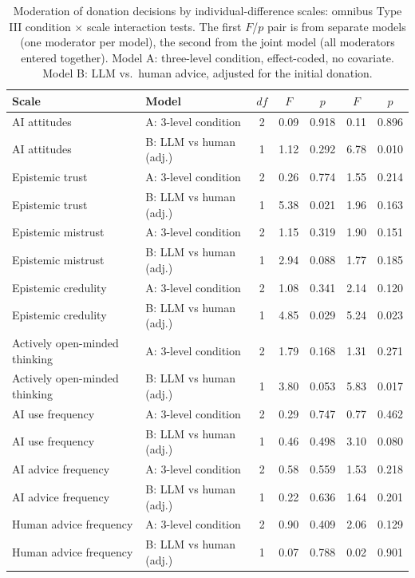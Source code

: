 \begin{table}

\caption{\label{tab:scale_moderation}Moderation of donation decisions by individual-difference scales: omnibus Type III condition $\times$ scale interaction tests. The first $F$/$p$ pair is from separate models (one moderator per model), the second from the joint model (all moderators entered together). Model A: three-level condition, effect-coded, no covariate. Model B: LLM vs.\ human advice, adjusted for the initial donation.}
\centering
\begin{tabular}[t]{llccccc}
\toprule
Scale & Model & $df$ & $F$ & $p$ & $F$ & $p$\\
\midrule
AI attitudes & A: 3-level condition & 2 & 0.09 & 0.918 & 0.11 & 0.896\\
AI attitudes & B: LLM vs human (adj.) & 1 & 1.12 & 0.292 & 6.78 & 0.010\\
Epistemic trust & A: 3-level condition & 2 & 0.26 & 0.774 & 1.55 & 0.214\\
Epistemic trust & B: LLM vs human (adj.) & 1 & 5.38 & 0.021 & 1.96 & 0.163\\
Epistemic mistrust & A: 3-level condition & 2 & 1.15 & 0.319 & 1.90 & 0.151\\
\addlinespace
Epistemic mistrust & B: LLM vs human (adj.) & 1 & 2.94 & 0.088 & 1.77 & 0.185\\
Epistemic credulity & A: 3-level condition & 2 & 1.08 & 0.341 & 2.14 & 0.120\\
Epistemic credulity & B: LLM vs human (adj.) & 1 & 4.85 & 0.029 & 5.24 & 0.023\\
Actively open-minded thinking & A: 3-level condition & 2 & 1.79 & 0.168 & 1.31 & 0.271\\
Actively open-minded thinking & B: LLM vs human (adj.) & 1 & 3.80 & 0.053 & 5.83 & 0.017\\
\addlinespace
AI use frequency & A: 3-level condition & 2 & 0.29 & 0.747 & 0.77 & 0.462\\
AI use frequency & B: LLM vs human (adj.) & 1 & 0.46 & 0.498 & 3.10 & 0.080\\
AI advice frequency & A: 3-level condition & 2 & 0.58 & 0.559 & 1.53 & 0.218\\
AI advice frequency & B: LLM vs human (adj.) & 1 & 0.22 & 0.636 & 1.64 & 0.201\\
Human advice frequency & A: 3-level condition & 2 & 0.90 & 0.409 & 2.06 & 0.129\\
\addlinespace
Human advice frequency & B: LLM vs human (adj.) & 1 & 0.07 & 0.788 & 0.02 & 0.901\\
\bottomrule
\end{tabular}
\end{table}

